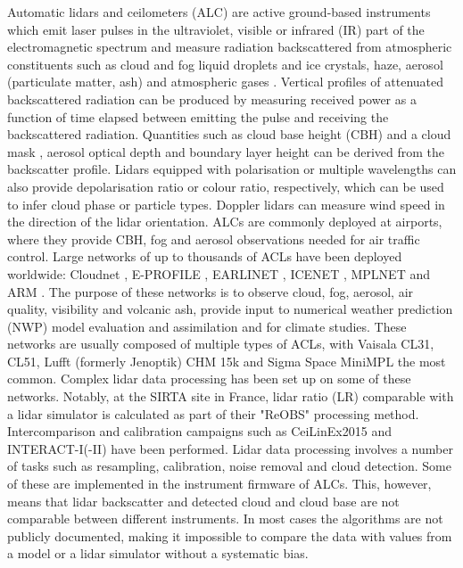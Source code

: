 Automatic lidars and ceilometers (ALC) are active ground-based instruments
which emit laser pulses in the ultraviolet, visible or infrared (IR) part of the
electromagnetic spectrum and measure radiation backscattered from atmospheric
constituents such as cloud and fog liquid droplets and ice crystals, haze,
aerosol (particulate matter, ash) and atmospheric gases \citep{emeis2010}.
Vertical profiles of attenuated backscattered radiation can be produced
by measuring received power as a function of time elapsed between emitting the
pulse and receiving the backscattered radiation. Quantities such as
cloud base height (CBH) and a cloud mask
\citep{pal1992,wang2001,martucci2010,costa-suros2013,tricht2014,liu2015b,liu2015a,lewis2016,cromwell2019,silber2018}, aerosol optical depth
\citep{marenco1997,welton2000,welton2002,wiegner2012,wiegner2014,jin2015,dionisi2018} and boundary layer height
\citep{eresmaa2006,munkel2007,emeis2009,tsaknakis2011,milroy2012,knepp2017}
can be derived from the
backscatter profile. Lidars equipped with polarisation or multiple wavelengths
can also provide depolarisation ratio or colour ratio, respectively, which can be used
to infer cloud phase or particle types. Doppler lidars can measure wind
speed in the direction of the lidar orientation. ALCs are commonly deployed
at airports, where they provide CBH, fog and aerosol observations
needed for air traffic control. Large networks of up to
thousands of ACLs have been deployed worldwide: Cloudnet \citep{illingworth2007},
E-PROFILE \citep{illingworth2018}, EARLINET \citep{pappalardo2014},
ICENET \citep{cazorla2017}, MPLNET \citep{welton2006} and ARM \citep{stokes1994,campbell2002}.
The purpose of these networks is to observe cloud, fog, aerosol, air quality,
visibility and volcanic ash, provide input to numerical weather prediction (NWP)
model evaluation and
assimilation \citep{illingworth2015a,illingworth2018} and for climate studies.
These networks are usually composed of multiple types of ACLs, with Vaisala CL31,
CL51, Lufft (formerly Jenoptik) CHM 15k and Sigma Space MiniMPL
the most common.
Complex lidar data processing has been set up on some of these networks. Notably,
at the SIRTA site in France, lidar ratio (LR)
comparable with a lidar simulator \citep{chiriaco2018} is calculated 
as part of their "ReOBS" processing method. Intercomparison and calibration campaigns such as
CeiLinEx2015 \citep{mattis2016} and INTERACT-I(-II)
\citep{rosoldi2018,madonna2018} have been performed.
Lidar data processing involves a number of tasks such as resampling,
calibration, noise removal and cloud detection. Some of these are implemented
in the instrument firmware of ALCs. This, however, means that
lidar backscatter and detected cloud and cloud base are not comparable
between different instruments. In most cases the algorithms are not publicly
documented, making it impossible to compare the data with values from a model or a lidar simulator
without a systematic bias.

